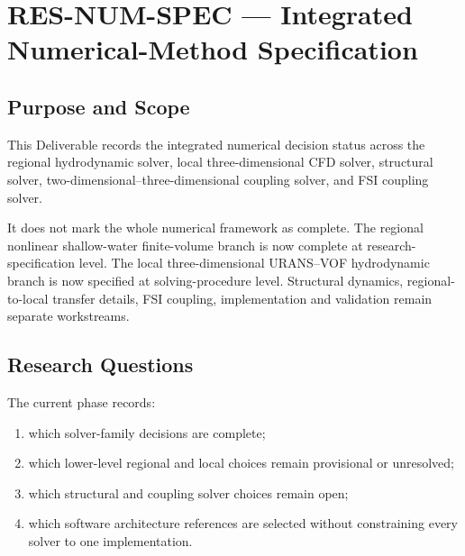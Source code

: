 
\section{RES-NUM-SPEC --- Integrated Numerical-Method Specification}
\label{sec:res-num-spec}

\subsection{Purpose and Scope}
\label{sec:res-num-spec-purpose}

This Deliverable records the integrated numerical decision status across
the regional hydrodynamic solver, local three-dimensional CFD solver,
structural solver, two-dimensional--three-dimensional coupling solver,
and FSI coupling solver.

It does not mark the whole numerical framework as complete. The
regional nonlinear shallow-water finite-volume branch is now complete
at research-specification level. The local three-dimensional
URANS--VOF hydrodynamic branch is now specified at solving-procedure
level. Structural dynamics, regional-to-local transfer details, FSI
coupling, implementation and validation remain separate workstreams.

\subsection{Research Questions}
\label{sec:res-num-spec-research-questions}

The current phase records:

\begin{enumerate}
  \item which solver-family decisions are complete;
  \item which lower-level regional and local choices remain provisional
    or unresolved;
  \item which structural and coupling solver choices remain open;
  \item which software architecture references are selected without
    constraining every solver to one implementation.
\end{enumerate}

